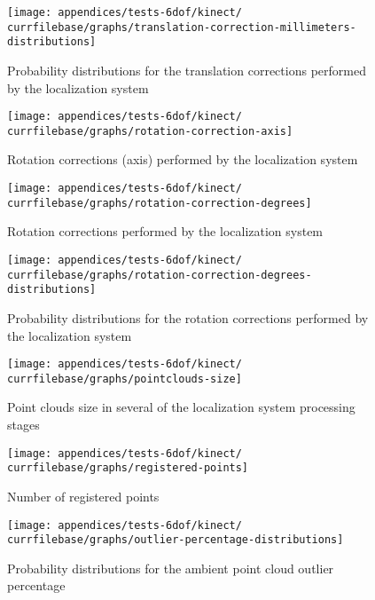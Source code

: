 \begin{figure}[H]
	\centering
	\texttt{[image: appendices/tests-6dof/kinect/\\currfilebase/graphs/translation-correction-millimeters-distributions]}
	\caption{Probability distributions for the translation corrections performed by the localization system}
\end{figure}


\begin{figure}[H]
	\centering
	\texttt{[image: appendices/tests-6dof/kinect/\\currfilebase/graphs/rotation-correction-axis]}
	\caption{Rotation corrections (axis) performed by the localization system}
\end{figure}

\begin{figure}[H]
	\centering
	\texttt{[image: appendices/tests-6dof/kinect/\\currfilebase/graphs/rotation-correction-degrees]}
	\caption{Rotation corrections performed by the localization system}
\end{figure}

\begin{figure}[H]
	\centering
	\texttt{[image: appendices/tests-6dof/kinect/\\currfilebase/graphs/rotation-correction-degrees-distributions]}
	\caption{Probability distributions for the rotation corrections performed by the localization system}
\end{figure}


\begin{figure}[H]
	\centering
	\texttt{[image: appendices/tests-6dof/kinect/\\currfilebase/graphs/pointclouds-size]}
	\caption{Point clouds size in several of the localization system processing stages}
\end{figure}

\begin{figure}[H]
	\centering
	\texttt{[image: appendices/tests-6dof/kinect/\\currfilebase/graphs/registered-points]}
	\caption{Number of registered points}
\end{figure}

\begin{figure}[H]
	\centering
	\texttt{[image: appendices/tests-6dof/kinect/\\currfilebase/graphs/outlier-percentage-distributions]}
	\caption{Probability distributions for the ambient point cloud outlier percentage}
\end{figure}



